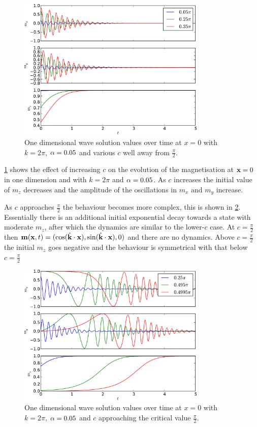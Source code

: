 \begin{figure}
  \centering
  \includegraphics[width=0.8\textwidth]{plots/wave_exact_solution_parameters/exact_solution_parameters.pdf}
  \caption{One dimensional wave solution values over time at $x=0$ with $k = 2\pi$, $\alpha = 0.05$ and various $c$ well away from $\frac{\pi}{2}$.}
  \label{fig:wave-solution-vary-c}
\end{figure}

\cref{fig:wave-solution-vary-c} shows the effect of increasing $c$ on the evolution of the magnetisation at $\mathbf{x} = 0$ in one dimension and with $k = 2\pi$ and $\alpha = 0.05$.
As $c$ increases the initial value of $m_z$ decreases and the amplitude of the oscillations in $m_x$ and $m_y$ increase.

As $c$ approaches $\frac{\pi}{2}$ the behaviour becomes more complex, this is shown in \cref{fig:wave-solution-vary-c-complex}.
Essentially there is an additional initial exponential decay towards a state with moderate $m_z$, after which the dynamics are similar to the lower-$c$ case.
At $c=\frac{\pi}{2}$ then $\mathbf{m}(\mathbf{x}, t)= (\cos({\hat{\mathbf{k}}}\cdot\mathbf{x}), \sin({\hat{\mathbf{k}}}\cdot\mathbf{x}), 0)$ and there are no dynamics.
Above $c=\frac{\pi}{2}$ the initial $m_z$ goes negative and the behaviour is symmetrical with that below $c=\frac{\pi}{2}$

\begin{figure}
  \centering
  \includegraphics[width=0.8\textwidth]{plots/wave_exact_solution_parameters/exact_solution_parameters_complex.pdf}
  \caption{One dimensional wave solution values over time at $x=0$ with $k = 2\pi$, $\alpha = 0.05$ and $c$ approaching the critical value $\frac{\pi}{2}$.}
  \label{fig:wave-solution-vary-c-complex}
\end{figure}


